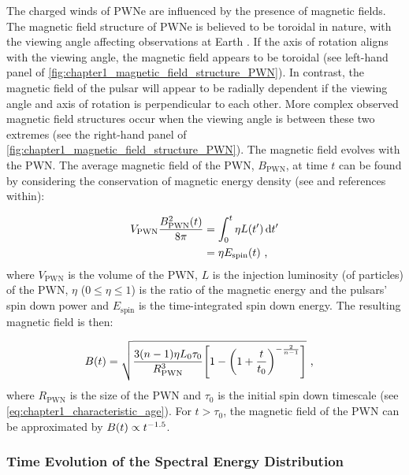 The charged winds of PWNe are influenced by the presence of magnetic fields. The magnetic field structure of PWNe is believed to be toroidal in nature, with the viewing angle affecting observations at Earth \citep{2006ApJ...638..225K, 2012SSRv..166..231R}. If the axis of rotation aligns with the viewing angle, the magnetic field appears to be toroidal (see left-hand panel of \autoref{fig:chapter1_magnetic_field_structure_PWN}). In contrast, the magnetic field of the pulsar will appear to be radially dependent if the viewing angle and axis of rotation is perpendicular to each other. More complex observed magnetic field structures occur when the viewing angle is between these two extremes (see the right-hand panel of \autoref{fig:chapter1_magnetic_field_structure_PWN}).
\newpar
The magnetic field evolves with the PWN. The average magnetic field of the PWN, $B_\text{PWN}$, at time $t$ can be found by considering the conservation of magnetic energy density (see \cite{2010ApJ...715.1248T} and references within):

\begin{equation}
    \begin{aligned}
    V_\text{PWN}\frac{B^2_\text{PWN}\qty(t)}{8\pi}&=\int_0^t\eta L\qty(t')\dd{t'} \\
    &=\eta E_\text{spin}\qty(t)\text{ ,}
    \end{aligned} \label{eq:chapter_1_magnetic_conservation_energy}
\end{equation}
\noindent where $V_\text{PWN}$ is the volume of the PWN, $L$ is the injection luminosity (of particles) of the PWN, $\eta$ ($0\leq\eta\leq 1$) is the ratio of the magnetic energy and the pulsars' spin down power and $E_\text{spin}$ is the time-integrated spin down energy. The resulting magnetic field is then:

\begin{equation}
    \begin{aligned}
    B\qty(t)&=\sqrt{\frac{3\qty(n-1)\eta L_0\tau_0}{R^3_\text{PWN}}\qty[1-\qty(1+\frac{t}{t_0})^{-\frac{2}{n-1}}]}\text{ ,}
    \end{aligned} \label{eq:chapter_1_magnetic_field_ev}
\end{equation}
\noindent where $R_\text{PWN}$ is the size of the PWN and $\tau_0$ is the initial spin down timescale (see \autoref{eq:chapter1_characteristic_age}). For $t>\tau_0$, the magnetic field of the PWN can be approximated by $B\qty(t)\propto t^{-1.5}$.

\subsubsection{Time Evolution of the Spectral Energy Distribution}


